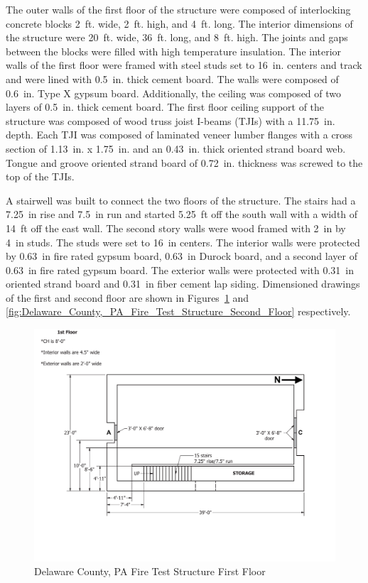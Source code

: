 \documentclass{article}
\begin{document}
The outer walls of the first floor of the structure were composed of interlocking concrete blocks 2~ft. wide, 2~ft. high, and 4~ft. long. The interior dimensions of the structure were 20~ft. wide, 36~ft. long, and 8~ft. high. The joints and gaps between the blocks were filled with high temperature insulation. The interior walls of the first floor were framed with steel studs set to 16~in. centers and track and were lined with 0.5~in. thick cement board. The walls were composed of 0.6~in. Type X gypsum board. Additionally, the ceiling was composed of two layers of 0.5~in. thick cement board. The first floor ceiling support of the structure was composed of wood truss joist I-beams (TJIs) with a 11.75~in. depth. Each TJI was composed of laminated veneer lumber flanges with a cross section of 1.13~in. x 1.75~in. and an 0.43~in. thick oriented strand board web. Tongue and groove oriented strand board of 0.72~in. thickness was screwed to the top of the TJIs. 

A stairwell was built to connect the two floors of the structure. The stairs had a 7.25~in rise and 7.5~in run and started 5.25~ft off the south wall with a width of 14~ft off the east wall. The second story walls were wood framed with 2~in by 4~in studs. The studs were set to 16~in centers. The interior walls were protected by 0.63~in fire rated gypsum board, 0.63~in Durock board, and a second layer of 0.63~in fire rated gypsum board. The exterior walls were protected with 0.31~in oriented strand board and 0.31~in fiber cement lap siding. Dimensioned drawings of the first and second floor are shown in Figures~\ref{fig:Delaware_County,_PA_Fire_Test_Structure_First_Floor} and \ref{fig:Delaware_County,_PA_Fire_Test_Structure_Second_Floor} respectively.

\begin{figure}[!ht]
	\centering
	\includegraphics[width=\columnwidth]{Figures/Air_Entrainment/West_Test_Structure_1st_Floor_original_nodim.pdf}
	\caption{Delaware County, PA Fire Test Structure First Floor}
	\label{fig:Delaware_County,_PA_Fire_Test_Structure_First_Floor}
\end{figure}
\end{document}
